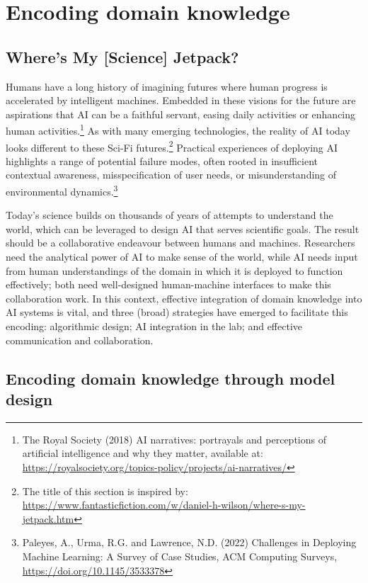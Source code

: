 \section{Encoding domain knowledge}\label{encoding-domain-knowledge}

\subsection{Where's My {[}Science{]} Jetpack?}\label{wheres-my-science-jetpack}

Humans have a long history of imagining futures where human progress is
accelerated by intelligent machines. Embedded in these visions for the
future are aspirations that AI can be a faithful servant, easing daily
activities or enhancing human activities.\footnote{The Royal Society
  (2018) AI narratives: portrayals and perceptions of artificial
  intelligence and why they matter, available at:
  \url{https://royalsociety.org/topics-policy/projects/ai-narratives/}}
As with many emerging technologies, the reality of AI today looks
different to these Sci-Fi futures.\footnote{The title of this section is
  inspired by:
  \url{https://www.fantasticfiction.com/w/daniel-h-wilson/where-s-my-jetpack.htm}}
Practical experiences of deploying AI highlights a range of potential
failure modes, often rooted in insufficient contextual awareness,
misspecification of user needs, or misunderstanding of environmental
dynamics.\footnote{Paleyes, A., Urma, R.G. and Lawrence, N.D. (2022)
  Challenges in Deploying Machine Learning: A Survey of Case Studies,
  ACM Computing Surveys,
  \url{https://doi.org/10.1145/3533378}}

Today's science builds on thousands of years of attempts to understand
the world, which can be leveraged to design AI that serves scientific
goals. The result should be a collaborative endeavour between humans and
machines. Researchers need the analytical power of AI to make sense of
the world, while AI needs input from human understandings of the domain
in which it is deployed to function effectively; both need well-designed
human-machine interfaces to make this collaboration work. In this
context, effective integration of domain knowledge into AI systems is
vital, and three (broad) strategies have emerged to facilitate this
encoding: algorithmic design; AI integration in the lab; and effective
communication and collaboration.

\subsection{Encoding domain knowledge through model
design}\label{encoding-domain-knowledge-through-model-design}

